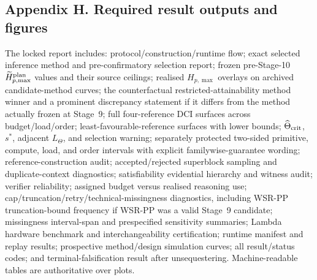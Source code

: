 \documentclass[11pt,a4paper]{article}
\begin{document}
\subsection*{Appendix H. Required result outputs and figures}
The locked report includes: protocol/construction/runtime flow; exact selected inference method and pre-confirmatory selection report; frozen pre-Stage-10 $\widetilde H_{p,\max}^{\rm plan}$ values and their source ceilings; realised $H_{p,\max}$ overlays on archived candidate-method curves; the counterfactual restricted-attainability method winner and a prominent discrepancy statement if it differs from the method actually frozen at Stage~9; full four-reference DCI surfaces across budget/load/order; least-favourable-reference surfaces with lower bounds; $\widehat\Theta_{\rm crit}$, $s^\ast$, adjacent $L_\Theta$, and selection warning; separately protected two-sided primitive, compute, load, and order intervals with explicit familywise-guarantee wording; reference-construction audit; accepted/rejected superblock sampling and duplicate-context diagnostics; satisfiability evidential hierarchy and witness audit; verifier reliability; assigned budget versus realised reasoning use; cap/truncation/retry/technical-missingness diagnostics, including WSR-PP truncation-bound frequency if WSR-PP was a valid Stage~9 candidate; missingness interval-span and prespecified sensitivity summaries; Lambda hardware benchmark and interchangeability certification; runtime manifest and replay results; prospective method/design simulation curves; all result/status codes; and terminal-falsification result after unsequestering. Machine-readable tables are authoritative over plots.
\end{document}
